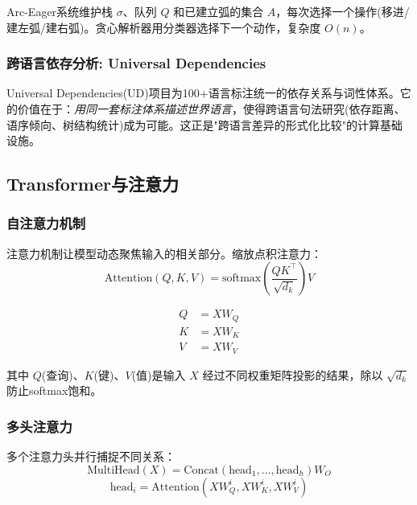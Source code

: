 Arc-Eager系统维护栈 $\sigma$、队列 $Q$ 和已建立弧的集合 $A$，每次选择一个操作(移进/建左弧/建右弧)。贪心解析器用分类器选择下一个动作，复杂度 $O(n)$。

\subsubsection{跨语言依存分析: Universal Dependencies}

Universal Dependencies(UD)项目为100+语言标注统一的依存关系与词性体系。它的价值在于：\emph{用同一套标注体系描述世界语言}，使得跨语言句法研究(依存距离、语序倾向、树结构统计)成为可能。这正是"跨语言差异的形式化比较"的计算基础设施。

\subsection{Transformer与注意力}

\subsubsection{自注意力机制}

注意力机制让模型动态聚焦输入的相关部分。缩放点积注意力：
\begin{equation}
    \text{Attention}(Q, K, V) = \text{softmax}\left(\frac{QK^\top}{\sqrt{d_k}}\right)V
\end{equation}

\begin{equation}
    \begin{aligned}
    Q &= XW_Q \\
    K &= XW_K \\
    V &= XW_V
    \end{aligned}
\end{equation}

其中 $Q$(查询)、$K$(键)、$V$(值)是输入 $X$ 经过不同权重矩阵投影的结果，除以 $\sqrt{d_k}$ 防止softmax饱和。

\subsubsection{多头注意力}

多个注意力头并行捕捉不同关系：
\begin{equation}
    \text{MultiHead}(X) = \text{Concat}(\text{head}_1, \ldots, \text{head}_h)W_O
\end{equation}
\begin{equation}
    \text{head}_i = \text{Attention}(XW_Q^i, XW_K^i, XW_V^i)
\end{equation}

